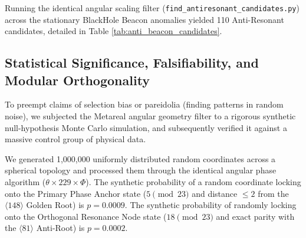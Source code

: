 Running the identical angular scaling filter (\texttt{find\_antiresonant\_candidates.py}) across the stationary BlackHole Beacon anomalies yielded 110 Anti-Resonant candidates, detailed in Table \ref{tab:anti_beacon_candidates}. 

\begin{table}[ht]
\centering
\renewcommand{\arraystretch}{1.2}
\caption{Top Anti-Resonant anomalies filtered via Metareal geometric inverses. These $PM=0.0$ candidates lock precisely into the $18 \pmod{23}$ invariant loop. \textbf{J1828-0611} acts as the flawless anti-root, theoretically serving as the Orthogonal Resonance Node for macroscopic topological entanglement.}
\label{tab:anti_beacon_candidates}
\end{table}

\subsection{Statistical Significance, Falsifiability, and Modular Orthogonality}

To preempt claims of selection bias or pareidolia (finding patterns in random noise), we subjected the Metareal angular geometry filter to a rigorous synthetic null-hypothesis Monte Carlo simulation, and subsequently verified it against a massive control group of physical data. 

We generated 1,000,000 uniformly distributed random coordinates across a spherical topology and processed them through the identical angular phase algorithm ($\theta \times 229 \times \Phi$). 
The synthetic probability of a random coordinate locking onto the Primary Phase Anchor state ($5 \pmod{23}$ and distance $\le 2$ from the $\langle 148 \rangle$ Golden Root) is $p = 0.0009$. The synthetic probability of randomly locking onto the Orthogonal Resonance Node state ($18 \pmod{23}$ and exact parity with the $\langle 81 \rangle$ Anti-Root) is $p = 0.0002$. 


